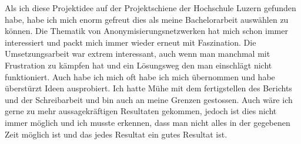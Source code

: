 Als ich diese Projektidee auf der Projektschiene der Hochschule Luzern gefunden habe, habe ich mich enorm gefreut dies als meine Bachelorarbeit auswählen zu können.
Die Thematik von Anonymisierungsnetzwerken hat mich schon immer interessiert und packt mich immer wieder erneut mit Faszination.
Die Umsetzungsarbeit war extrem interessant, auch wenn man manchmal mit Frustration zu kämpfen hat und ein Lösungsweg den man einschlägt nicht funktioniert.
Auch habe ich mich oft habe ich mich übernommen und habe überstürzt Ideen ausprobiert.
Ich hatte Mühe mit dem fertigstellen des Berichts und der Schreibarbeit und bin auch an meine Grenzen gestossen.
Auch wäre ich gerne zu mehr aussagekräftigen Resultaten gekommen, jedoch ist dies nicht immer möglich und ich musste erkennen, dass man nicht alles in der gegebenen Zeit möglich ist und das jedes Resultat ein gutes Resultat ist.
